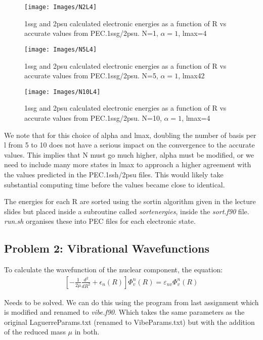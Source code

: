 \documentclass{article}
\begin{document}
\begin{figure}[H]
	\centering
	\texttt{[image: Images/N2L4]}\\
	\caption{1ssg and 2psu calculated electronic energies as a function of R vs accurate values from PEC.1ssg/2psu. N=1, $\alpha=1$, lmax=4}
	\label{N2L4}
\end{figure}
\begin{figure}[H]
	\centering
	\texttt{[image: Images/N5L4]}\\
	\caption{1ssg and 2psu calculated electronic energies as a function of R vs accurate values from PEC.1ssg/2psu. N=5, $\alpha=1$, lmax42}
	\label{N5L4}
\end{figure}
\begin{figure}[H]
	\centering
	\texttt{[image: Images/N10L4]}\\
	\caption{1ssg and 2psu calculated electronic energies as a function of R vs accurate values from PEC.1ssg/2psu. N=10, $\alpha=1$, lmax=4}
	\label{N10L4}
\end{figure}

We note that for this choice of alpha and lmax, doubling the number of basis per l from 5 to 10 does not have a serious impact on the convergence to the accurate values. This implies that N must go much higher, alpha must be modified, or we need to include many more states in lmax to approach a higher agreement with the values predicted in the PEC.1ssh/2psu files. This would likely take substantial computing time before the values became close to identical. 

The energies for each R are sorted using the sortin algorithm given in the lecture slides but placed inside a subroutine called \textit{sortenergies}, inside the \textit{sort.f90} file. \textit{run.sh} organises these into PEC files for each electronic state.

    
    \subsection{Problem 2: Vibrational Wavefunctions}
   
	
	To calculate the wavefunction of the nuclear component, the equation:
	\begin{gather}
		\left[-\frac{1}{2\mu}\frac{d^2}{dR^2} + \epsilon_n(R)\right] \Phi^{n}_{v}(R) = \varepsilon_{nv}\Phi^{n}_{v}(R)
	\end{gather} 
	
	Needs to be solved. We can do this using the program from last assignment which is modified and renamed to \textit{vibe.f90}. Which takes the same parameters as the original LaguerreParams.txt (renamed to VibeParams.txt) but with the addition of the reduced mass $\mu$ in both.
	
\end{document}
